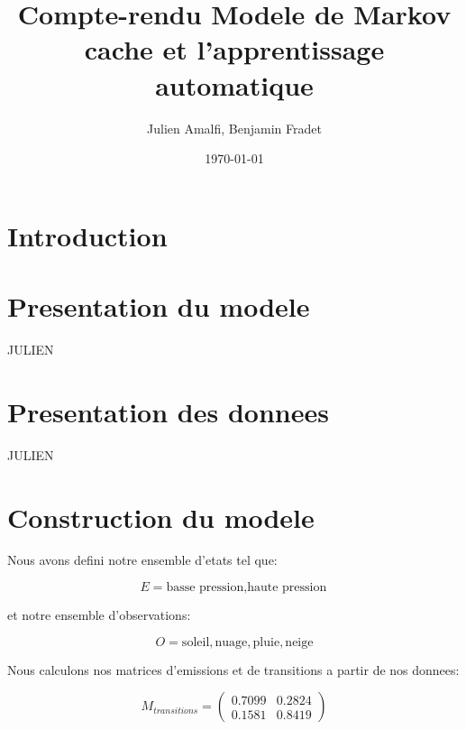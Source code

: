 \documentclass{article}
\title{Compte-rendu Modele de Markov cache et l'apprentissage automatique}
\author{Julien Amalfi, Benjamin Fradet}
\date{\today}
\begin{document}
\maketitle
\thispagestyle{fancy}


\begin{abstract}
\end{abstract}


\begin{multicols}{2}

\section{Introduction}\label{sec:intro}


\section{Presentation du modele}\label{sec:model}
JULIEN

\section{Presentation des donnees}\label{sec:donnees}
JULIEN

\section{Construction du modele}\label{sec:construct}

Nous avons defini notre ensemble d'etats tel que:

\begin{equation}
    E = {\text{basse pression}, \text{haute pression}}
\end{equation}

et notre ensemble d'observations:

\begin{equation}
    O = {\text{soleil}, \text{nuage}, \text{pluie}, \text{neige}}
\end{equation}

Nous calculons nos matrices d'emissions et de transitions a partir de nos
donnees:

\begin{equation}
    M_{transitions} =
    \begin{pmatrix*}
        0.7099 & 0.2824 \\
        0.1581 & 0.8419
    \end{pmatrix*}
\end{equation}


\end{multicols}
\end{document}
